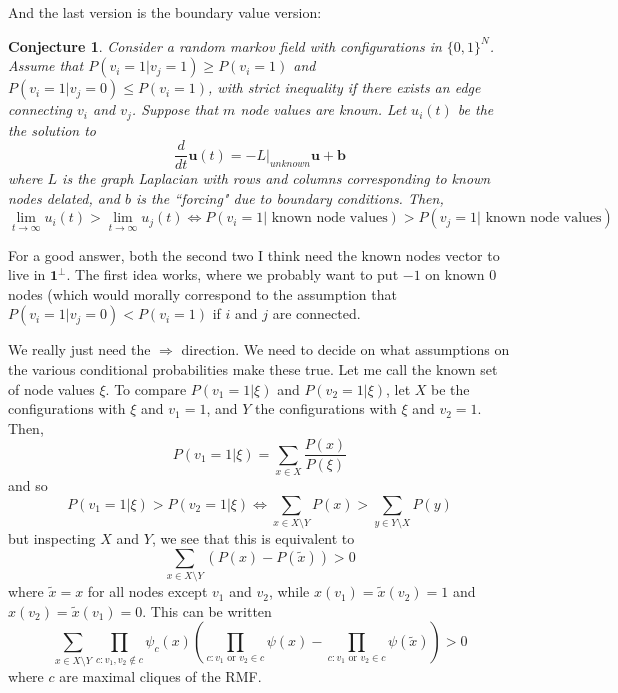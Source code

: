\documentclass[10pt]{article}
\newtheorem{conj}{Conjecture}
\theoremstyle{definition}
\numberwithin{theorem}{section}
\numberwithin{definition}{section}
\numberwithin{lemma}{section}
\numberwithin{corollary}{section}
\numberwithin{clm}{section}
\numberwithin{rmk}{section}
\renewcommand{\b}{\bm}
\begin{document}
And the last version is the boundary value version:

\begin{conj}\label{boundarVal}
	Consider a random markov field with configurations in $\{0,1\}^N$. Assume that $P(v_i = 1|v_j = 1) \geq P(v_i = 1)$ and $P(v_i = 1|v_j = 0) \leq  P(v_i = 1)$, with strict inequality if there exists an edge connecting $v_i$ and $v_j$. Suppose that $m$ node values are known. Let $u_i(t)$ be the the solution to
	\[
	\frac{d}{dt}\b{u}(t) = -L|_{unknown}\b{u} + \b{b}
	\]
	where $L$ is the graph Laplacian with rows and columns corresponding to known nodes delated, and $b$ is the ``forcing" due to boundary conditions. Then,
	\[
		\lim_{t\rightarrow \infty} u_i(t) >\lim_{t\rightarrow \infty} u_j(t) \Leftrightarrow P(v_i = 1|\text{ known node values}) > P(v_j = 1 | \text{ known node values})
	\]
\end{conj}

For a good answer, both the second two I think need the known nodes vector to live in $\b{1}^{\perp}$. The first idea works, where we probably want to put $-1$ on known $0$ nodes (which would morally correspond to the assumption that $P(v_i = 1|v_j = 0) < P(v_i = 1)$ if $i$ and $j$ are connected.

We really just need the $\Rightarrow$ direction. We need to decide on what assumptions on the various conditional probabilities make these true. Let me call the known set of node values $\xi$. To compare $P(v_1 =1 | \xi)$ and $P(v_2 = 1 | \xi)$, let $X$ be the configurations with $\xi$ and $v_1 = 1$, and $Y$ the configurations with $\xi$ and $v_2 = 1$. Then,
\[
P(v_1 = 1| \xi) = \sum_{x\in X} \frac{P(x)}{P(\xi)}
\]
and so
\[
P(v_1 = 1| \xi) > P(v_2 = 1|\xi) \Leftrightarrow \sum_{x\in X\setminus Y} P(x) >\sum_{y \in Y\setminus X} P(y)
\]
but inspecting $X$ and $Y$, we see that this is equivalent to 
\[
\sum_{x\in X\setminus Y} (P(x) - P(\tilde{x})) > 0
\]
where $\tilde{x} = x$ for all nodes except $v_1$ and $v_2$, while $x(v_1) = \tilde{x}(v_2) = 1$ and $x(v_2) = \tilde{x}(v_1) = 0$. This can be written
\begin{equation}
\sum_{x\in X\setminus Y}\prod_{c:v_1,v_2 \not \in c}\psi_c(x)\left(\prod_{c:v_1\text{ or }v_2  \in c}\psi(x) - \prod_{c:v_1\text{ or }v_2  \in c}\psi(\tilde{x}) \right) >0
\end{equation}
where $c$ are maximal cliques of the RMF.


	


\end{document}

